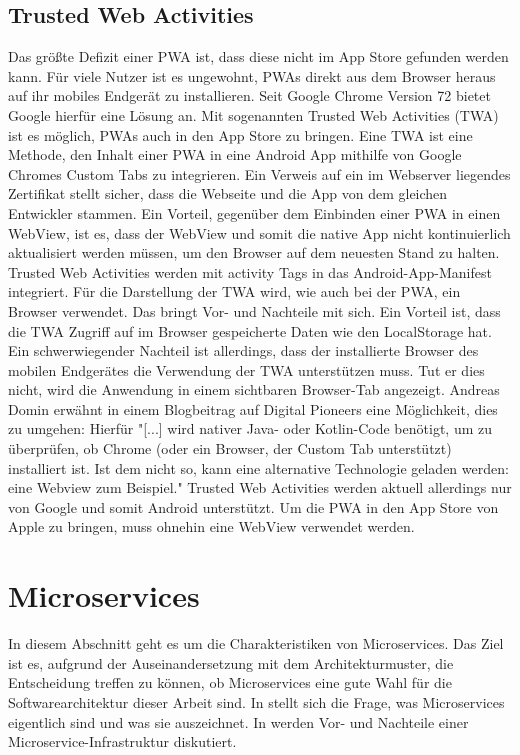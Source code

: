 \subsection{Trusted Web Activities}
\label{subsec:trustedwebactivities}
Das größte Defizit einer PWA ist, dass diese nicht im App Store gefunden werden kann.
Für viele Nutzer ist es ungewohnt, PWAs direkt aus dem Browser heraus auf ihr mobiles Endgerät zu installieren.
Seit Google Chrome Version 72 bietet Google hierfür eine Lösung an.
Mit sogenannten Trusted Web Activities (TWA) ist es möglich, PWAs auch in den App Store
zu bringen. Eine TWA ist eine Methode, den Inhalt einer PWA in eine Android App mithilfe
von Google Chromes Custom Tabs zu integrieren.\cite{TrustedWebActivitiesGoogle}
Ein Verweis auf ein im Webserver liegendes Zertifikat stellt sicher,
dass die Webseite und die App von dem gleichen Entwickler
stammen. Ein Vorteil, gegenüber dem Einbinden einer PWA in einen WebView, ist es,
dass der WebView und somit die native App nicht kontinuierlich aktualisiert werden müssen,
um den Browser auf dem neuesten Stand zu halten.
Trusted Web Activities werden mit activity Tags in das Android-App-Manifest integriert. Für die Darstellung
der TWA wird, wie auch bei der PWA, ein Browser verwendet. Das bringt Vor- und Nachteile mit sich.
Ein Vorteil ist, dass die TWA Zugriff auf im Browser gespeicherte Daten wie den LocalStorage
hat. Ein schwerwiegender Nachteil ist allerdings, dass der installierte Browser des mobilen Endgerätes
die Verwendung der TWA unterstützen muss. Tut er dies nicht, wird die Anwendung in einem sichtbaren
Browser-Tab angezeigt. Andreas Domin erwähnt in einem Blogbeitrag auf Digital Pioneers eine Möglichkeit,
dies zu umgehen: Hierfür "[...] wird nativer Java- oder Kotlin-Code benötigt, um zu überprüfen, ob Chrome
(oder ein Browser, der Custom Tab unterstützt) installiert ist.
Ist dem nicht so, kann eine alternative Technologie geladen werden:
eine Webview zum Beispiel."\cite[2. Abschnitt]{TrustedWebActivitiesT3N}
Trusted Web Activities werden aktuell allerdings nur von Google und somit Android unterstützt. Um die PWA
in den App Store von Apple zu bringen, muss ohnehin eine WebView verwendet werden.

\section{Microservices}
\label{sec:microservices}
In diesem Abschnitt geht es um die Charakteristiken von Microservices. Das Ziel ist es,
aufgrund der Auseinandersetzung mit dem Architekturmuster, die Entscheidung treffen zu können, ob Microservices
eine gute Wahl für die Softwarearchitektur dieser Arbeit sind. In 
stellt sich die Frage, was Microservices eigentlich sind und was sie auszeichnet. In
 werden Vor- und Nachteile einer Microservice-Infrastruktur
diskutiert.


